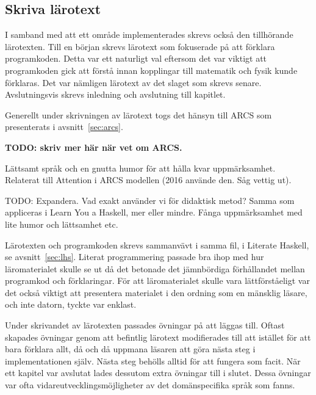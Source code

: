 \begin{draft}

\subsection{Skriva lärotext}

I samband med att ett område implementerades skrevs också den tillhörande
lärotexten. Till en början skrevs lärotext som fokuserade på att förklara
programkoden. Detta var ett naturligt val eftersom det var viktigt att
programkoden gick att förstå innan kopplingar till matematik och fysik kunde
förklaras. Det var nämligen lärotext av det slaget som skrevs senare.
Avslutningsvis skrevs inledning och avslutning till kapitlet.

\end{draft}
\begin{binge}

Generellt under skrivningen av lärotext togs det hänsyn till ARCS som
presenterats i avsnitt~\ref{sec:arcs}. 

\textbf{TODO: skriv mer här när vet om ARCS.}

Lättsamt språk och en gnutta humor för att hålla kvar
uppmärksamhet. Relaterat till Attention i ARCS modellen (2016
använde den. Såg vettig ut).

TODO: Expandera. Vad exakt använder vi för didaktisk metod? Samma
som appliceras i Learn You a Haskell, mer eller mindre. Fånga
uppmärksamhet med lite humor och lättsamhet etc.

\end{binge}
\begin{draft}

Lärotexten och programkoden skrevs sammanvävt i samma fil, i Literate
Haskell, se avsnitt~\ref{sec:lhs}. Literat programmering passade bra ihop med
hur läromaterialet skulle se ut då det betonade det jämnbördiga förhållandet
mellan programkod och förklaringar. För att läromaterialet skulle vara
lättförståeligt var det också viktigt att presentera materialet i den ordning
som en mänsklig läsare, och inte datorn, tyckte var enklast.

Under skrivandet av lärotexten passades övningar på att läggas till. Oftast skapades övningar genom att befintlig lärotext modifierades till att istället för att bara förklara allt, då och då uppmana läsaren att göra nästa steg i implementationen själv. Nästa steg behölls alltid för att fungera som facit. När ett kapitel var avslutat lades dessutom extra övningar till i slutet. Dessa övningar var ofta vidareutvecklingsmöjligheter av det domänspecifika språk som fanns.

\end{draft}
